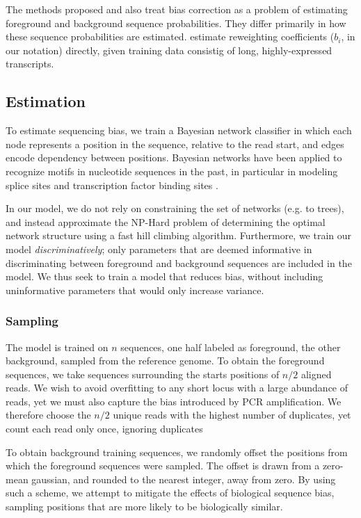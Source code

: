 \documentclass{bioinfo}
\begin{document}
The methods proposed \citet{Hansen2010} and \cite{Roberts2011} also treat bias
correction as a problem of estimating foreground and background sequence
probabilities. They differ primarily in how these sequence probabilities are
estimated. \citet{Li2010} estimate reweighting coefficients ($b_i$, in our
notation) directly, given training data consistig of long, highly-expressed
transcripts.



\subsection{Estimation}

To estimate sequencing bias, we train a Bayesian network classifier in which
each node represents a position in the sequence, relative to the read start, and
edges encode dependency between positions.  Bayesian networks have been applied
to recognize motifs in nucleotide sequences in the past, in particular in
modeling splice sites \citep{Cai2000, Chen2005} and transcription factor binding
sites \citep{Ben-Gal2005, Grau2006, Pudimat2005}. 

In our model, we do not rely on constraining the set of networks (e.g. to
trees), and instead approximate the NP-Hard problem of determining the optimal
network structure using a fast hill climbing algorithm. Furthermore, we
train our model \emph{discriminatively}; only parameters that are deemed
informative in discriminating between foreground and background sequences are
included in the model. We thus seek to train a model that reduces bias, without
including uninformative parameters that would only increase variance.


\subsubsection{Sampling}

The model is trained on $n$ sequences, one half labeled as foreground, the other
background, sampled from the reference genome. To obtain the foreground
sequences, we take sequences surrounding the starts positions of $n/2$ aligned
reads. We wish to avoid overfitting to any short locus with a large abundance of reads,
yet we must also capture the bias introduced by PCR amplification. We therefore
choose the $n/2$ unique reads with the highest number of duplicates,
yet count each read only once, ignoring duplicates

To obtain background training sequences, we randomly offset the positions from
which the foreground sequences were sampled.  The offset is drawn from a
zero-mean gaussian, and rounded to the nearest integer, away from zero.
By using such a scheme, we attempt to mitigate the effects of biological
sequence bias, sampling positions that are more likely to be biologically
similar.
\end{document}
